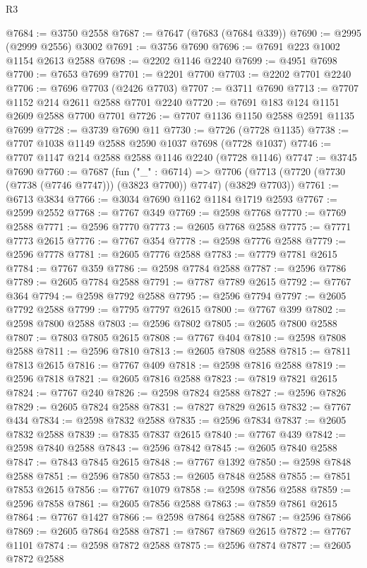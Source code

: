 \begin{lexlean}{R3}
\begin{coremodule}
@7684 := @3750 @2558
@7687 := @7647 (@7683 (@7684 @339))
@7690 := @2995 (@2999 @2556) @3002
@7691 := @3756 @7690
@7696 := @7691 @223 @1002 @1154 @2613 @2588
@7698 := @2202 @1146 @2240
@7699 := @4951 @7698
@7700 := @7653 @7699
@7701 := @2201 @7700
@7703 := @2202 @7701 @2240
@7706 := @7696 @7703 (@2426 @7703)
@7707 := @3711 @7690
@7713 := @7707 @1152 @214 @2611 @2588 @7701 @2240
@7720 := @7691 @183 @124 @1151 @2609 @2588 @7700 @7701
@7726 := @7707 @1136 @1150 @2588 @2591 @1135 @7699
@7728 := @3739 @7690 @11
@7730 := @7726 (@7728 @1135)
@7738 := @7707 @1038 @1149 @2588 @2590 @1037 @7698 (@7728 @1037)
@7746 := @7707 @1147 @214 @2588 @2588 @1146 @2240 (@7728 @1146)
@7747 := @3745 @7690
@7760 := @7687
    (fun ("_" : @6714) =>
    @7706 (@7713 (@7720 (@7730 (@7738 (@7746 @7747))) (@3823 @7700)) @7747) (@3829 @7703))
@7761 := @6713 @3834
@7766 := @3034 @7690 @1162 @1184 @1719 @2593
@7767 := @2599 @2552
@7768 := @7767 @349
@7769 := @2598 @7768
@7770 := @7769 @2588
@7771 := @2596 @7770
@7773 := @2605 @7768 @2588
@7775 := @7771 @7773 @2615
@7776 := @7767 @354
@7778 := @2598 @7776 @2588
@7779 := @2596 @7778
@7781 := @2605 @7776 @2588
@7783 := @7779 @7781 @2615
@7784 := @7767 @359
@7786 := @2598 @7784 @2588
@7787 := @2596 @7786
@7789 := @2605 @7784 @2588
@7791 := @7787 @7789 @2615
@7792 := @7767 @364
@7794 := @2598 @7792 @2588
@7795 := @2596 @7794
@7797 := @2605 @7792 @2588
@7799 := @7795 @7797 @2615
@7800 := @7767 @399
@7802 := @2598 @7800 @2588
@7803 := @2596 @7802
@7805 := @2605 @7800 @2588
@7807 := @7803 @7805 @2615
@7808 := @7767 @404
@7810 := @2598 @7808 @2588
@7811 := @2596 @7810
@7813 := @2605 @7808 @2588
@7815 := @7811 @7813 @2615
@7816 := @7767 @409
@7818 := @2598 @7816 @2588
@7819 := @2596 @7818
@7821 := @2605 @7816 @2588
@7823 := @7819 @7821 @2615
@7824 := @7767 @240
@7826 := @2598 @7824 @2588
@7827 := @2596 @7826
@7829 := @2605 @7824 @2588
@7831 := @7827 @7829 @2615
@7832 := @7767 @434
@7834 := @2598 @7832 @2588
@7835 := @2596 @7834
@7837 := @2605 @7832 @2588
@7839 := @7835 @7837 @2615
@7840 := @7767 @439
@7842 := @2598 @7840 @2588
@7843 := @2596 @7842
@7845 := @2605 @7840 @2588
@7847 := @7843 @7845 @2615
@7848 := @7767 @1392
@7850 := @2598 @7848 @2588
@7851 := @2596 @7850
@7853 := @2605 @7848 @2588
@7855 := @7851 @7853 @2615
@7856 := @7767 @1079
@7858 := @2598 @7856 @2588
@7859 := @2596 @7858
@7861 := @2605 @7856 @2588
@7863 := @7859 @7861 @2615
@7864 := @7767 @1427
@7866 := @2598 @7864 @2588
@7867 := @2596 @7866
@7869 := @2605 @7864 @2588
@7871 := @7867 @7869 @2615
@7872 := @7767 @1101
@7874 := @2598 @7872 @2588
@7875 := @2596 @7874
@7877 := @2605 @7872 @2588

\end{coremodule}
\end{lexlean}

